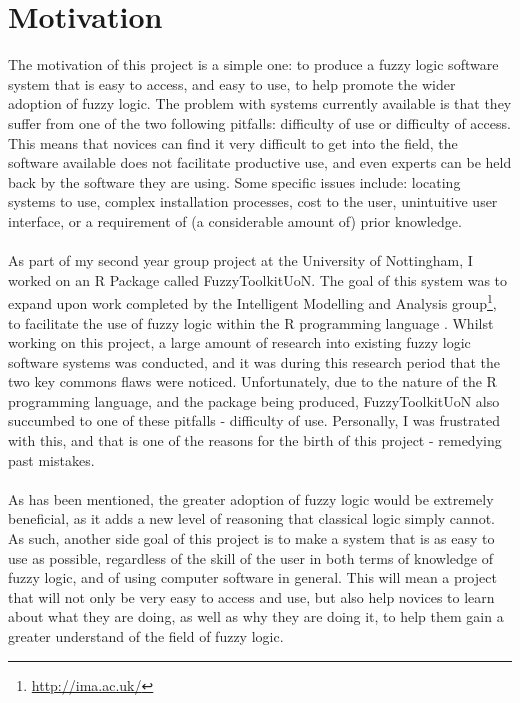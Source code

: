 \section{Motivation}
The motivation of this project is a simple one: to produce a fuzzy logic software system that is easy to access, and easy to use, to help promote the wider adoption of fuzzy logic. The problem with systems currently available is that they suffer from one of the two following pitfalls: difficulty of use or difficulty of access. This means that novices can find it very difficult to get into the field, the software available does not facilitate productive use, and even experts can be held back by the software they are using. Some specific issues include: locating systems to use, complex installation processes, cost to the user, unintuitive user interface, or a requirement of (a considerable amount of) prior knowledge. 
\ \\
\ \\
As part of my second year group project at the University of Nottingham, I worked on an R Package called FuzzyToolkitUoN. The goal of this system was to expand upon work completed by the Intelligent Modelling and Analysis group\footnote{\url{http://ima.ac.uk/}}, to facilitate the use of fuzzy logic within the R programming language \cite{wagner2011fuzzy}. Whilst working on this project, a large amount of research into existing fuzzy logic software systems was conducted, and it was during this research period that the two key commons flaws were noticed. Unfortunately, due to the nature of the R programming language, and the package being produced, FuzzyToolkitUoN also succumbed to one of these pitfalls - difficulty of use. Personally, I was frustrated with this, and that is one of the reasons for the birth of this project - remedying past mistakes.
\ \\
\ \\
As has been mentioned, the greater adoption of fuzzy logic would be extremely beneficial, as it adds a new level of reasoning that classical logic simply cannot. As such, another side goal of this project is to make a system that is as easy to use as possible, regardless of the skill of the user in both terms of knowledge of fuzzy logic, and of using computer software in general. This will mean a project that will not only be very easy to access and use, but also help novices to learn about what they are doing, as well as why they are doing it, to help them gain a greater understand of the field of fuzzy logic.
\ \\
